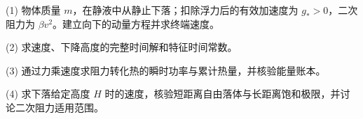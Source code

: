 (1) 物体质量 \(m\)，在静液中从静止下落；扣除浮力后的有效加速度为 \(g_*>0\)，二次阻力为 \(\beta v^2\)。建立向下的动量方程并求终端速度。

(2) 求速度、下降高度的完整时间解和特征时间常数。

(3) 通过力乘速度求阻力转化热的瞬时功率与累计热量，并核验能量账本。

(4) 求下落给定高度 \(H\) 时的速度，核验短距离自由落体与长距离饱和极限，并讨论二次阻力适用范围。
